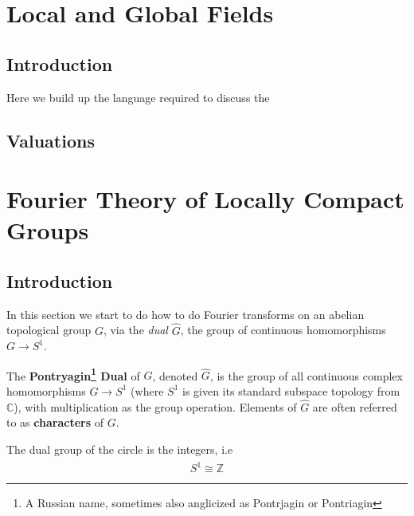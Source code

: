 \documentclass[11pt, x11names]{book}
\newcommand{\zz}{\mathbb{Z}}
\newcommand{\cc}{\mathbb{C}}
\renewcommand{\hat}{\widehat}
\begin{document}
\section{Local and Global Fields}
\label{section: Local and Global Fields}

\subsection*{Introduction}
Here we build up the language required to discuss the 

\subsection{Valuations}



\newpage
\section{Fourier Theory of Locally Compact Groups}
\label{section: Pontryagin Duality}

\subsection*{Introduction}
In this section we start to do how to do Fourier transforms on an abelian topological group $G$, via the \textit{dual} $\hat{G}$, the group of continuous homomorphisms $G \to S^1$. 

\begin{defn}
The \textbf{Pontryagin\footnote{A Russian name, sometimes also anglicized as Pontrjagin or Pontriagin} Dual} of $G$, denoted $\hat{G}$, is the group of all continuous
complex homomorphisms $G \to S^1$ (where $S^1$ is given its standard subspace topology
from $\cc$), with multiplication as the group operation. Elements of $\hat{G}$ are often
referred to as \textbf{characters} of $G$.
\end{defn}

\begin{example}
\label{example: dual of S^1 is Z}
    The dual group of the circle is the integers, i.e
    \begin{equation*}
        \hat{S^1} \cong \zz
    \end{equation*}
\end{example}
\end{document}

